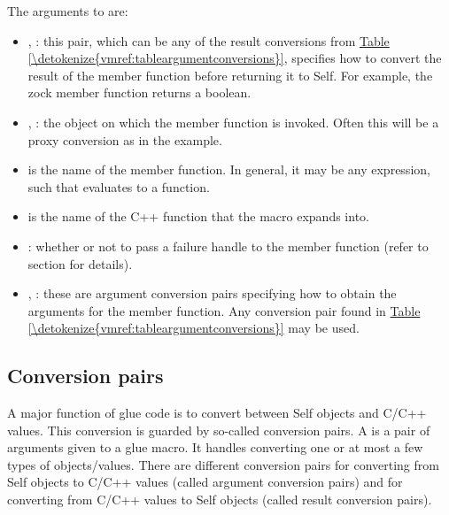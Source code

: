 \documentclass[letterpaper,10pt,english]{sphinxmanual}
\begin{document}
The arguments to  are:
\begin{itemize}
\item {} 
, : this pair, which can be any of the result conversions from \hyperref[\detokenize{vmref:tableargumentconversions}]{Table \ref{\detokenize{vmref:tableargumentconversions}}},
specifies how to convert the result of the member function before returning it to Self. For
example, the zock member function returns a boolean.

\item {} 
, : the object on which the member function is invoked. Often this will
be a proxy conversion as in the  example.

\item {} 
 is the name of the member function. In general, it may be any expression, such that
 evaluates to a function.

\item {} 
 is the name of the C++ function that the  macro expands into.

\item {} 
: whether or not to pass a failure handle to the member function (refer to section
{\hyperref[\detokenize{vmref:calling-c-functions}]{}} for details).

\item {} 
, : these are argument conversion pairs specifying how to obtain the arguments for the
member function. Any conversion pair found in \hyperref[\detokenize{vmref:tableargumentconversions}]{Table \ref{\detokenize{vmref:tableargumentconversions}}} may be used.

\end{itemize}


\subsection{Conversion pairs}
\label{\detokenize{vmref:index-80}}\label{\detokenize{vmref:conversion-pairs}}
A major function of glue code is to convert between Self objects and C/C++ values. This conversion
is guarded by so-called conversion pairs. A  is a pair of arguments given to a
glue macro. It handles converting one or at most a few types of objects/values. There are different
conversion pairs for converting from Self objects to C/C++ values (called argument conversion
pairs) and for converting from C/C++ values to Self objects (called result conversion pairs).
\end{document}
